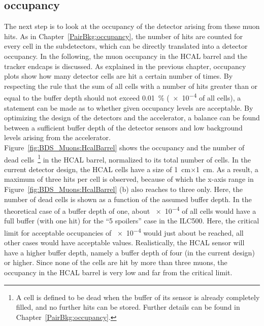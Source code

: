 \subsection{\sid occupancy}
\label{BDS_Muons:sidocc}
The next step is to look at the occupancy of the detector arising from these muon hits.
As in Chapter~\ref{PairBkg:occupancy}, the number of hits are counted for every cell in the subdetectors, which can be directly translated into a detector occupancy.
In the following, the muon occupancy in the \sid HCAL barrel and the tracker endcaps is discussed.
As explained in the previous chapter, occupancy plots show how many detector cells are hit a certain number of times. 
By respecting the rule that the sum of all cells with a number of hits greater than or equal to the buffer depth should not exceed \SI{0.01}{\percent} (\num{e-4} of all cells), a statement can be made as to whether given occupancy levels are acceptable.
By optimizing the design of the detectors and the accelerator, a balance can be found between a sufficient buffer depth of the detector sensors and low background levels arising from the accelerator.
\\Figure~\ref{fig:BDS_Muons:HcalBarrel} shows the occupancy and the number of dead cells~\footnote{A cell is defined to be dead when the buffer of its sensor is already completely filled, and no further hits can be stored. Further details can be found in Chapter~\ref{PairBkg:occupancy}.} in the HCAL barrel, normalized to its total number of cells.
In the current detector design, the HCAL cells have a size of \SI{1}{\centi\meter}$\times$\SI{1}{\centi\meter}.
As a result, a maximum of three hits per cell is observed, because of which the x-axis range in Figure~\ref{fig:BDS_Muons:HcalBarrel} (b) also reaches to three only.
Here, the number of dead cells is shown as a function of the assumed buffer depth.
In the theoretical case of a buffer depth of one, about \num{e-4} of all cells would have a full buffer (with one hit) for the ``5 spoilers'' case in the ILC500.
Here, the critical limit for acceptable occupancies of \num{e-4} would just about be reached, all other cases would have acceptable values.
Realistically, the HCAL sensor will have a higher buffer depth, namely a buffer depth of four (in the current design) or higher.
Since none of the cells are hit by more than three muons, the occupancy in the HCAL barrel is very low and far from the critical limit.
